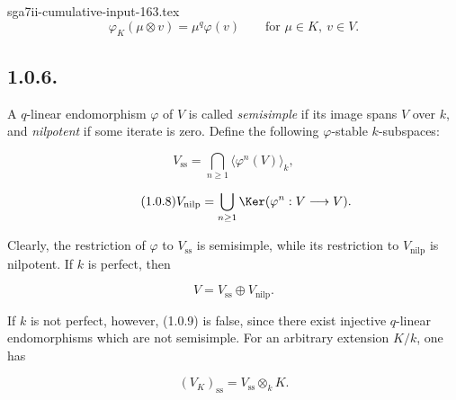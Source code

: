 \begin{filecontents*}{sga7ii-cumulative-input-163.tex}
\begin{equation}\tag{1.0.5}
\varphi_K(\mu\otimes v)=\mu^q\varphi(v)
\qquad\text{for }\mu\in K,\ v\in V.
\end{equation}

\subsection*{1.0.6.}
A $q$-linear endomorphism $\varphi$ of $V$ is called \emph{semisimple} if
its image spans $V$ over $k$, and \emph{nilpotent} if some iterate is zero.
Define the following $\varphi$-stable $k$-subspaces:

\begin{equation}\tag{1.0.7}
V_{\mathrm{ss}}=
\bigcap_{n\geq1}\langle\varphi^n(V)\rangle_k,
\end{equation}

\begin{equation}\tag{1.0.8}
V_{\mathrm{nilp}}=
\bigcup_{n\geq1}\Ker(\varphi^n:V\longrightarrow V).
\end{equation}

Clearly, the restriction of $\varphi$ to $V_{\mathrm{ss}}$ is semisimple,
while its restriction to $V_{\mathrm{nilp}}$ is nilpotent. If $k$ is
perfect, then

\begin{equation}\tag{1.0.9}
V=V_{\mathrm{ss}}\oplus V_{\mathrm{nilp}}.
\end{equation}

If $k$ is not perfect, however, (1.0.9) is false, since there exist injective
$q$-linear endomorphisms which are not semisimple. For an arbitrary extension
$K/k$, one has

\begin{equation}\tag{1.0.10}
(V_K)_{\mathrm{ss}}=V_{\mathrm{ss}}\otimes_kK.
\end{equation}

\end{filecontents*}
